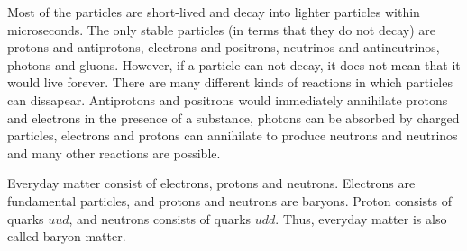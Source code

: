 Most of the particles are short-lived and decay into lighter particles within microseconds. The only stable particles (in terms that they do not decay) are protons and antiprotons, electrons and positrons, neutrinos and antineutrinos, photons and gluons. However, if a particle can not decay, it does not mean that it would live forever. There are many different kinds of reactions in which particles can dissapear. Antiprotons and positrons would immediately annihilate protons and electrons in the presence of a substance, photons can be absorbed by charged particles, electrons and protons can annihilate to produce neutrons and neutrinos and many other reactions are possible. 

Everyday matter consist of electrons, protons and neutrons. Electrons are fundamental particles, and protons and neutrons are baryons. Proton consists of quarks $uud$, and neutrons consists of quarks $udd$. Thus, everyday matter is also called baryon matter. 




